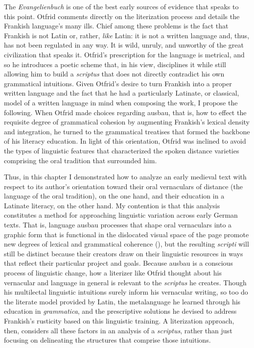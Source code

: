 The \textit{Evangelienbuch} is one of the best early sources of evidence that speaks to this point. Otfrid comments directly on the literization process and details the Frankish language’s many ills. Chief among these problems is the fact that Frankish is not Latin or, rather, \textit{like} Latin: it is not a written language and, thus, has not been regulated in any way. It is wild, unruly, and unworthy of the great civilization that speaks it. Otfrid’s prescription for the language is metrical, and so he introduces a poetic scheme that, in his view, disciplines it while still allowing him to build a \textit{scriptus} that does not directly contradict his own grammatical intuitions. Given Otfrid’s desire to turn Frankish into a proper written language and the fact that he had a particularly Latinate, or classical, model of a written language in mind when composing the work, I propose the following. When Otfrid made choices regarding ausbau, that is, how to effect the requisite degree of grammatical cohesion by augmenting Frankish’s lexical density and integration, he turned to the grammatical treatises that formed the backbone of his literacy education. In light of this orientation, Otfrid was inclined to avoid the types of linguistic features that characterized the spoken distance varieties comprising the oral tradition that surrounded him.

Thus, in this chapter I demonstrated how to analyze an early medieval text with respect to its author’s orientation toward their oral vernaculars of distance (the language of the oral tradition), on the one hand, and their education in a Latinate literacy, on the other hand. My contention is that this analysis constitutes a method for approaching linguistic variation across early German texts. That is, language ausbau processes that shape oral vernaculars into a graphic form that is functional in the dislocated visual space of the page promote new degrees of lexical and grammatical coherence (), but the resulting \textit{scripti} will still be distinct because their creators draw on their linguistic resources in ways that reflect their particular project and goals. Because ausbau is a conscious process of linguistic change, how a literizer like Otfrid thought about his vernacular and language in general is relevant to the \textit{scriptus} he creates. Though his multilectal linguistic intuitions surely inform his vernacular writing, so too do the literate model provided by Latin, the metalanguage he learned through his education in \textit{grammatica}, and the prescriptive solutions he devised to address Frankish’s rusticity based on this linguistic training. A literization approach, then, considers all these factors in an analysis of a \textit{scriptus}, rather than just focusing on delineating the structures that comprise those intuitions.


